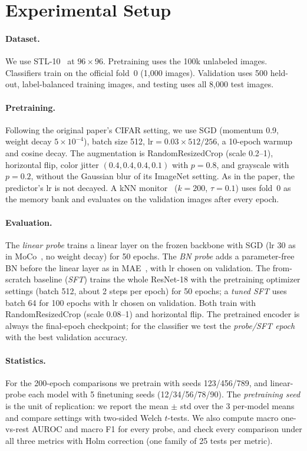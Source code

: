 \documentclass[10pt,twocolumn,letterpaper]{article}
\begin{document}
\section{Experimental Setup}
\label{sec:setup}

\paragraph{Dataset.}
We use STL-10~\cite{coates2011stl10} at $96\times96$. Pretraining uses the 100k unlabeled images.
Classifiers train on the official fold~0 (1,000 images). Validation uses 500 held-out, label-balanced training images, and testing uses all 8,000 test images.

\paragraph{Pretraining.}
Following the original paper's CIFAR setting, we use SGD (momentum 0.9, weight decay $5\!\times\!10^{-4}$), batch size 512, $\text{lr}=0.03\times512/256$, a 10-epoch warmup and cosine decay. The augmentation is RandomResizedCrop (scale 0.2--1), horizontal flip, color jitter $(0.4,0.4,0.4,0.1)$ with $p{=}0.8$, and grayscale with $p{=}0.2$, without the Gaussian blur of its ImageNet setting. As in the paper, the predictor's lr is not decayed.
A kNN monitor~\cite{wu2018instance} ($k{=}200$, $\tau{=}0.1$) uses fold~0 as the memory bank and evaluates on the validation images after every epoch.

\paragraph{Evaluation.}
The \emph{linear probe} trains a linear layer on the frozen backbone with SGD (lr 30 as in MoCo~\cite{he2020moco}, no weight decay) for 50 epochs. The \emph{BN probe} adds a parameter-free BN before the linear layer as in MAE~\cite{he2022mae}, with lr chosen on validation.
The from-scratch baseline (\emph{SFT}) trains the whole ResNet-18 with the pretraining optimizer settings (batch 512, about 2 steps per epoch) for 50 epochs; a \emph{tuned SFT} uses batch 64 for 100 epochs with lr chosen on validation.
Both train with RandomResizedCrop (scale 0.08--1) and horizontal flip.
The pretrained encoder is always the final-epoch checkpoint; for the classifier we test the \emph{probe/SFT epoch} with the best validation accuracy.

\paragraph{Statistics.}
For the 200-epoch comparisons we pretrain with seeds 123/456/789, and linear-probe each model with 5 finetuning seeds (12/34/56/78/90).
The \emph{pretraining seed} is the unit of replication: we report the mean $\pm$ std over the 3 per-model means and compare settings with two-sided Welch $t$-tests.
We also compute macro one-vs-rest AUROC and macro F1 for every probe, and check every comparison under all three metrics with Holm correction (one family of 25 tests per metric).
\end{document}
